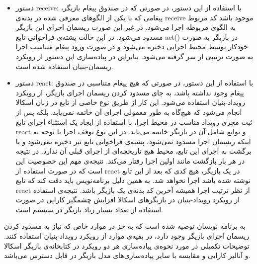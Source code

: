\begin{itemize}
\item دستور receive:
با استفاده از این دستور، در صورتی که در صندوق پیغام بازیگر، پیغامی که با یکی از الگوهای معرفی شده در بدنه‌ی receive موجود باشد کد مربوط به الگوی‌ مربوطه اجرا می‌شود. در غیر این صورت ریسمان اجرای این بازیگر مسدود می‌شود. در این حالت پشته‌ی فراخوانی تابع act() در بازیگر به صورت خودکار توسط محیط اجرایی ذخیره می‌شود و در صورت ورود پیغام متناسب اجرا به صورت ترتیبی از سر گرفته می‌شود. بنابراین در پیاده‌سازی این دستور از رویکرد ریسمان-بنیان استفاده شده است.
\item دستور react:
با استفاده از این دستور، در صورتی که هیچ پیغام متناسبی در صندوق پیغام وجود نداشته باشد، به جای مسدود کردن ریسمان اجرای بازیگر، از رویکرد رویداد-بنیان استفاده می‌شود. این کار از طریق نوع خاصی از تابع در زبان اسکالا انجام می‌شود که هیچ‌گاه به طور معمولی اجرای آن خاتمه نمی‌یابد. بلکه پس از ثبت مجری رویداد مناسب در محیط اجرا، با استفاده از ایجاد یک \gls{استثناء} اجرای تابع react و توابع شامل آن در بازیگر خاتمه می‌یابد. در این نوع توقف اجرا با توجه به اینکه ریسمان اجرا مسدود نمی‌شود، پشته‌ی فراخوانی تابع نیز ذخیره نمی‌شود و با برگشت به اجرای این تابع، محیط هیچ تاریخچه‌ای از اجرای قبلی آن ندارد. در نتیجه در هر بار بازگشت مانند اولین اجرا رفتار می‌کند. نتیجه‌ی مهم این خصوصیت این است که در صورت استفاده از react در یک بازیگر، هیچ کدی که بعد از این تابع نوشته شده باشد اجرا نخواهد شد. به همین دلیل برنامه‌نویس باید دقت کند که تابع react از نظر ترتیب اجرا همیشه آخرین کد بدنه‌ی یک بازیگر باشد.
نتیجه‌ی استفاده از رویکرد رویداد-بنیان در بازیگر‌های اسکالا افزایش چشمگیر کارایی در صورت استفاده از تعداد بسیار زیاد بازیگر در سیستم است. 
\end{itemize}
به برنامه نویسان توصیه شده است که به جز در موارد خاص که نیاز به مسدود کردن ریسمان اجرای بازیگر وجود دارد، در بقیه‌ی موارد از رویکرد رویداد-بنیان استفاده کنند. توضیحات تکمیلی در مورد نحوه‌ی پیاده‌سازی هر دو رویکرد در کتابخانه‌ی بازیگر اسکالا و آنالیز کارایی و مقایسه با سایر پیاده‌سازی‌های مدل بازیگر در  \cite{Haller2009202} قابل دسترس می‌باشد.

